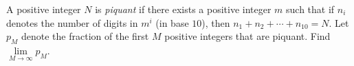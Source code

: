 A positive integer $N$ is \emph{piquant} if there exists a positive integer $m$ such that if $n_i$ denotes the number of digits in $m^i$ (in base $10$), then $n_1+n_2+\cdots + n_{10}=N$. Let $p_M$ denote the fraction of the first $M$ positive integers that are piquant. Find $\lim\limits_{M\to \infty} p_M$.